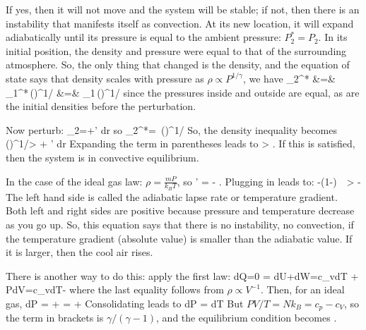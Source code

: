 \documentclass[11pt]{book}
\begin{document}


If yes, then it will not move and the system will be stable; if not, then there is an instability that manifests itself as convection. At its new location, it will expand adiabatically until its pressure is equal to the ambient pressure: $P_2^*=P_2$. In its initial position, the density and pressure were equal to that of the surrounding atmosphere. So, the only thing that changed is the density, and the equation of state says that density scales with pressure as $\rho\propto P^{1/\gamma}$, we have
\bea
\rho_2^* &=& \rho_1^*\,\left(\right)^{1/\gamma}
\vs
&=&
 \rho_1\,\left(\right)^{1/\gamma}\eea
 since the pressures inside and outside are equal, as are the initial densities before the perturbation.


Now perturb:
\be\rho_2=\rho+\rho' dr
\ee
so
\be
\rho_2^*= \rho \,\left(\right)^{1/\gamma}\ee
So, the density inequality becomes
\be
\rho \,\left(\right)^{1/\gamma}> \rho + \rho' dr\ee
Expanding the term in parentheses leads to
\be
{} > .
\ee
If this is satisfied, then the system is in convective equilibrium.

In the case of the ideal gas law: $\rho= \frac{mP}{k_BT}$, so
\be
\rho' =  - 
.\ee
Plugging in leads to:
\be
-\left(1-\right)\, \,  > -
\ee
The left hand side is called the adiabatic lapse rate or temperature gradient. Both left and right sides are positive because pressure and temperature decrease as you go up.
So, this equation says that there is no instability, no convection, if the temperature gradient (absolute value) is smaller than the adiabatic value. If it is larger, then the cool air rises.

There is another way to do this: apply the first law:
\be
dQ=0 = dU+dW=c_vdT + PdV=c_vdT-\ee
where the last equality follows from $\rho\propto V^{-1}$.
Then, for an ideal gas,
\be
dP =  +  
=    +  
\ee
Consolidating leads to
\be
dP = dT  \ee
 But $PV/T = Nk_B=c_p-c_V$, so the term in brackets is $\gamma/(\gamma-1)$, and the equilibrium condition becomes
.
\end{document}
